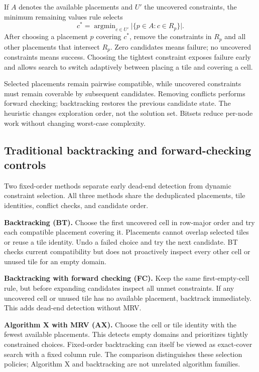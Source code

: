 \documentclass[UTF8,fontset=fandol,11pt,a4paper]{ctexart}
\begin{document}
If $A$ denotes the available placements and $U'$ the uncovered constraints,
the minimum remaining values rule selects
\begin{equation}
 c^*=\mathop{\arg\min}_{c\in U'}\bigl|\{p\in A:c\in R_p\}\bigr|.
\end{equation}
After choosing a placement $p$ covering $c^*$, remove the constraints in
$R_p$ and all other placements that intersect $R_p$. Zero candidates means
failure; no uncovered constraints means success. Choosing the tightest
constraint exposes failure early and allows search to switch adaptively
between placing a tile and covering a cell.

Selected placements remain pairwise compatible, while uncovered constraints
must remain coverable by subsequent candidates. Removing conflicts performs
forward checking; backtracking restores the previous candidate state.
The heuristic changes exploration order, not the solution set. Bitsets
reduce per-node work without changing worst-case complexity.

\clearpage
\subsection{Traditional backtracking and forward-checking controls}
Two fixed-order methods separate early dead-end detection from dynamic
constraint selection. All three methods share the deduplicated placements,
tile identities, conflict checks, and candidate order.

\noindent\textbf{Backtracking (BT).}\quad
Choose the first uncovered cell in row-major order and try each compatible
placement covering it. Placements cannot overlap selected tiles or reuse a
tile identity. Undo a failed choice and try the next candidate. BT checks
current compatibility but does not proactively inspect every other cell
or unused tile for an empty domain.

\medskip
\noindent\textbf{Backtracking with forward checking (FC).}\quad
Keep the same first-empty-cell rule, but before expanding candidates inspect
all unmet constraints. If any uncovered cell or unused tile has no available
placement, backtrack immediately. This adds dead-end detection without MRV.

\medskip
\noindent\textbf{Algorithm X with MRV (AX).}\quad
Choose the cell or tile identity with the fewest available placements.
This detects empty domains and prioritizes tightly constrained choices.
Fixed-order backtracking can itself be viewed as exact-cover search with
a fixed column rule. The comparison distinguishes these selection policies;
Algorithm X and backtracking are not unrelated algorithm families.
\end{document}
